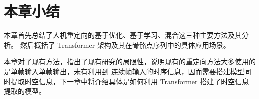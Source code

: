 \section{本章小结}
本章首先总结了人机重定向的基于优化、基于学习、混合这三种主要方法及其分析。
然后概括了 Transformer 架构及其在骨骼点序列中的具体应用场景。

本章对了现有方法，指出了现有研究的局限性，说明现有的重定向方法大多使用的是单帧输入单帧输出，未有利用到
连续帧输入的时序信息，因而需要搭建模型同时提取时空信息，下一章中将介绍具体是如何利用 Transformer 搭建了时空信息提取的模型。





